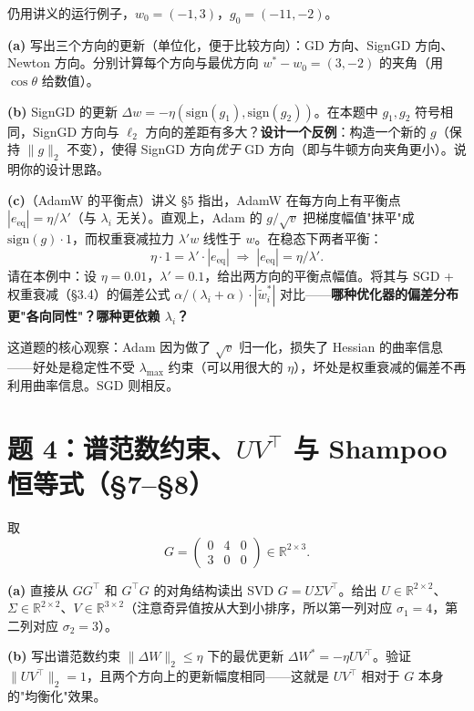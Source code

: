 \documentclass[12pt,a4paper]{article}
\begin{document}
仍用讲义的运行例子，$w_0 = (-1, 3)$，$g_0 = (-11, -2)$。

\textbf{(a)} 写出三个方向的更新（单位化，便于比较方向）：GD 方向、SignGD 方向、Newton 方向。分别计算每个方向与最优方向 $w^* - w_0 = (3, -2)$ 的夹角（用 $\cos\theta$ 给数值）。

\textbf{(b)} SignGD 的更新 $\Delta w = -\eta(\mathrm{sign}(g_1), \mathrm{sign}(g_2))$。在本题中 $g_1, g_2$ 符号相同，SignGD 方向与 $\ell_2$ 方向的差距有多大？\textbf{设计一个反例}：构造一个新的 $g$（保持 $\|g\|_2$ 不变），使得 SignGD 方向\emph{优于} GD 方向（即与牛顿方向夹角更小）。说明你的设计思路。

\textbf{(c)}（AdamW 的平衡点）讲义 §5 指出，AdamW 在每方向上有平衡点 $|e_{\mathrm{eq}}| = \eta/\lambda'$（与 $\lambda_i$ 无关）。直观上，Adam 的 $g/\sqrt{v}$ 把梯度幅值"抹平"成 $\mathrm{sign}(g) \cdot 1$，而权重衰减拉力 $\lambda' w$ 线性于 $w$。在稳态下两者平衡：
\[
\eta \cdot 1 = \lambda' \cdot |e_{\mathrm{eq}}| \;\Longrightarrow\; |e_{\mathrm{eq}}| = \eta/\lambda'.
\]
请在本例中：设 $\eta = 0.01$，$\lambda' = 0.1$，给出两方向的平衡点幅值。将其与 SGD + 权重衰减（§3.4）的偏差公式 $\alpha/(\lambda_i + \alpha) \cdot |\tilde w^*_i|$ 对比——\textbf{哪种优化器的偏差分布更"各向同性"？哪种更依赖 $\lambda_i$？}

\begin{thinkbox}
这道题的核心观察：Adam 因为做了 $\sqrt{v}$ 归一化，损失了 Hessian 的曲率信息——好处是稳定性不受 $\lambda_{\max}$ 约束（可以用很大的 $\eta$），坏处是权重衰减的偏差不再利用曲率信息。SGD 则相反。
\end{thinkbox}

\section*{题 4：谱范数约束、$UV^\top$ 与 Shampoo 恒等式（§7–§8）}

取
\[
G = \begin{pmatrix} 0 & 4 & 0 \\ 3 & 0 & 0 \end{pmatrix} \in \mathbb{R}^{2 \times 3}.
\]

\textbf{(a)} 直接从 $GG^\top$ 和 $G^\top G$ 的对角结构读出 SVD $G = U \Sigma V^\top$。给出 $U \in \mathbb{R}^{2\times 2}$、$\Sigma \in \mathbb{R}^{2\times 2}$、$V \in \mathbb{R}^{3\times 2}$（注意奇异值按从大到小排序，所以第一列对应 $\sigma_1 = 4$，第二列对应 $\sigma_2 = 3$）。

\textbf{(b)} 写出谱范数约束 $\|\Delta W\|_2 \le \eta$ 下的最优更新 $\Delta W^* = -\eta U V^\top$。验证 $\|U V^\top\|_2 = 1$，且两个方向上的更新幅度相同——这就是 $UV^\top$ 相对于 $G$ 本身的"均衡化"效果。
\end{document}
